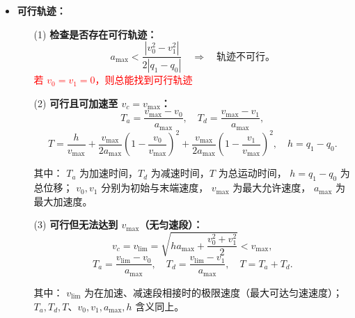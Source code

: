 \documentclass[../main.tex]{subfiles}
\begin{document}
\begin{enumerate}
\begin{enumerate}
{\begin{itemize}
\begin{figure}[H]
                    \caption{梯形轨迹图}
                \end{figure}   
                \item \textbf{可行轨迹：}
                \begin{itemize}
                    \item[(1)] \textbf{检查是否存在可行轨迹：}
                    \[
                    a_{\max} < \frac{|v_0^2 - v_1^2|}{2|q_1 - q_0|}
                    \quad \Rightarrow \quad \text{轨迹不可行。}
                    \]
                    \textcolor{red}{若 $v_0=v_1=0$，则总能找到可行轨迹}
                    
                    \vspace{0.5em}
                \item[(2)] \textbf{可行且可加速至 $v_c=v_{\max}$：}
                \[
                T_a = \frac{v_{\max}-v_0}{a_{\max}}, \quad
                T_d = \frac{v_{\max}-v_1}{a_{\max}},
                \]
                \[
                T = \frac{h}{v_{\max}}
                + \frac{v_{\max}}{2a_{\max}}\left(1-\frac{v_0}{v_{\max}}\right)^2
                + \frac{v_{\max}}{2a_{\max}}\left(1-\frac{v_1}{v_{\max}}\right)^2,
                \quad h=q_1-q_0.
                \]
                
                {\footnotesize
                其中：
                $T_a$ 为加速时间，$T_d$ 为减速时间，$T$ 为总运动时间，
                $h=q_1-q_0$ 为总位移；
                $v_0,v_1$ 分别为初始与末端速度，
                $v_{\max}$ 为最大允许速度，
                $a_{\max}$ 为最大加速度。
                }
                
                \vspace{0.5em}
                
                \item[(3)] \textbf{可行但无法达到 $v_{\max}$（无匀速段）：}
                \[
                v_c = v_{\lim} = 
                \sqrt{h a_{\max} + \frac{v_0^2 + v_1^2}{2}} < v_{\max},
                \]
                \[
                T_a = \frac{v_{\lim}-v_0}{a_{\max}}, \quad
                T_d = \frac{v_{\lim}-v_1}{a_{\max}}, \quad
                T = T_a + T_d.
                \]
                
                {\footnotesize
                其中：
                $v_{\lim}$ 为在加速、减速段相接时的极限速度（最大可达匀速速度）；
                $T_a,T_d,T$、$v_0,v_1,a_{\max},h$ 含义同上。
                }
                \end{itemize}
                

\end{itemize}}
\end{enumerate}
\end{enumerate}
\end{document}
